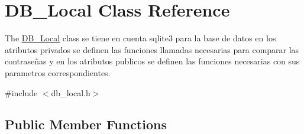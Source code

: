 \hypertarget{class_d_b___local}{}\section{D\+B\+\_\+\+Local Class Reference}
\label{class_d_b___local}


The \hyperlink{class_d_b___local}{D\+B\+\_\+\+Local} class se tiene en cuenta sqlite3 para la base de datos en los atributos privados se definen las funciones llamadas necesarias para comparar las contraseñas y en los atributos publicos se definen las funciones necesarias con sus parametros correspondientes.  




{\ttfamily \#include $<$db\+\_\+local.\+h$>$}

\subsection*{Public Member Functions}

